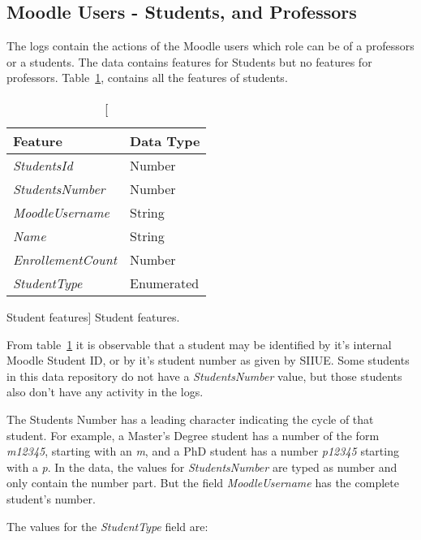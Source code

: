 \subsection{Moodle Users - Students, and Professors}

The logs contain the actions of the Moodle users which role can be of a
professors or a students. The data contains features for Students but no
features for professors. Table~\ref{tab:students_features}, contains all the
features of students.

\begin{table}[h!]
    \centering

    \begin{tabular}{l l}
        Feature                   & Data Type  \\ \hline
        \textit{StudentsId}       & Number     \\
        \textit{StudentsNumber}   & Number     \\
        \textit{MoodleUsername}   & String     \\
        \textit{Name}             & String     \\
        \textit{EnrollementCount} & Number     \\
        \textit{StudentType}      & Enumerated \\
    \end{tabular}

    \caption
        [Student features]
        {Student features.}

    \label{tab:students_features}
\end{table}

From table~\ref{tab:students_features} it is observable that a student may be
identified by it's internal Moodle Student ID, or by it's student number as
given by SIIUE. Some students in this data repository do not have a
\textit{StudentsNumber} value, but those students also don't have any activity
in the logs.

The Students Number has a leading character indicating the cycle of that
student. For example, a Master's Degree student has a number of the form
\textit{m12345}, starting with an \textit{m}, and a PhD student has a number
\textit{p12345} starting with a \textit{p}. In the data, the values for
\textit{StudentsNumber} are typed as number and only contain the number part.
But the field \textit{MoodleUsername} has the complete student's number.

The values for the \textit{StudentType} field are:

